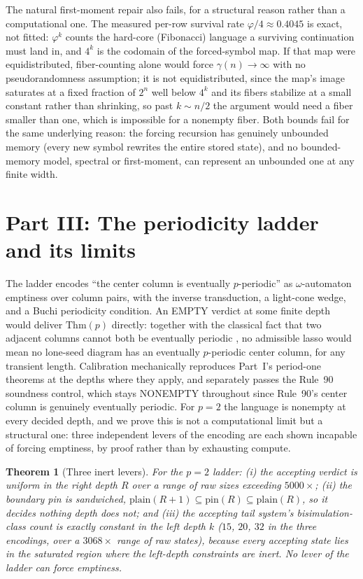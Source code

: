 \documentclass[11pt]{article}
\newtheorem{theorem}{Theorem}[section]
\theoremstyle{definition}
\newcommand{\gm}{\gamma}
\begin{document}
The natural first-moment repair also fails, for a structural reason rather than
a computational one. The measured per-row survival rate $\varphi/4\approx0.4045$
is exact, not fitted: $\varphi^k$ counts the hard-core (Fibonacci) language a
surviving continuation must land in, and $4^k$ is the codomain of the
forced-symbol map. If that map were equidistributed, fiber-counting alone would
force $\gm(n)\to\infty$ with no pseudorandomness assumption; it is not
equidistributed, since the map's image saturates at a fixed fraction of $2^n$
well below $4^k$ and its fibers stabilize at a small constant rather than
shrinking, so past $k\sim n/2$ the argument would need a fiber smaller than
one, which is impossible for a nonempty fiber. Both bounds fail for the same
underlying reason: the forcing recursion has genuinely unbounded memory (every
new symbol rewrites the entire stored state), and no bounded-memory model,
spectral or first-moment, can represent an unbounded one at any finite width.

\section{Part III: The periodicity ladder and its limits}
\label{sec:ladder}

The ladder encodes ``the center column is eventually $p$-periodic'' as
$\omega$-automaton emptiness over column pairs, with the inverse transduction, a
light-cone wedge, and a Buchi periodicity condition. An EMPTY verdict at some
finite depth would deliver $\mathrm{Thm}(p)$ directly: together with the
classical fact that two adjacent columns cannot both be eventually periodic
\cite[Prop.~3]{jen}\cite{kopra}, no admissible lasso would mean no lone-seed
diagram has an eventually $p$-periodic center column, for any transient
length. Calibration mechanically reproduces Part~I's period-one theorems at
the depths where they apply, and separately passes the Rule~90 soundness
control, which stays NONEMPTY throughout since Rule~90's center column is
genuinely eventually periodic. For $p=2$ the language is nonempty at every
decided depth, and we prove this is not a computational limit but a structural
one: three independent levers of the encoding are each shown incapable of
forcing emptiness, by proof rather than by exhausting compute.

\begin{theorem}[Three inert levers]\label{thm:ladder}
For the $p=2$ ladder: (i) the accepting verdict is uniform in the right depth
$R$ over a range of raw sizes exceeding $5000\times$; (ii) the boundary pin is
sandwiched, $\mathrm{plain}(R+1)\subseteq\mathrm{pin}(R)\subseteq\mathrm{plain}(R)$,
so it decides nothing depth does not; and (iii) the accepting tail system's
bisimulation-class count is \emph{exactly constant} in the left depth $k$
($15$, $20$, $32$ in the three encodings, over a $3068\times$ range of raw
states), because every accepting state lies in the saturated region where the
left-depth constraints are inert. No lever of the ladder can force emptiness.
\end{theorem}
\end{document}
